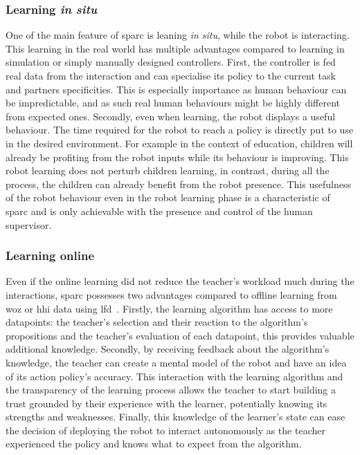 \subsubsection{Learning \emph{in situ}}
One of the main feature of \gls{sparc} is leaning \emph{in situ}, while the robot is interacting. This learning in the real world has multiple advantages compared to learning in simulation or simply manually designed controllers. First, the controller is fed real data from the interaction and can specialise its policy to the current task and partners specificities. This is especially importance as human behaviour can be impredictable, and as such real human behaviours might be highly different from expected ones. Secondly, even when learning, the robot displays a useful behaviour. The time required for the robot to reach a policy is directly put to use in the desired environment. For example in the context of education, children will already be profiting from the robot inputs while its behaviour is improving. This robot learning does not perturb children learning, in contrast, during all the process, the children can already benefit from the robot presence. This usefulness of the robot behaviour even in the robot learning phase is a characteristic of \gls{sparc} and is only achievable with the presence and control of the human supervisor.

\subsubsection{Learning online}
Even if the online learning did not reduce the teacher's workload much during the interactions, \gls{sparc} possesses two advantages compared to offline learning from \gls{woz} or \gls{hhi} data using \gls{lfd}~\citep{sequeira2016discovering,liu2014train}. Firstly, the learning algorithm has access to more datapoints: the teacher's selection and their reaction to the algorithm's propositions and the teacher's evaluation of each datapoint, this provides valuable additional knowledge. Secondly, by receiving feedback about the algorithm's knowledge, the teacher can create a mental model of the robot and have an idea of its action policy's accuracy. This interaction with the learning algorithm and the transparency of the learning process allows the teacher to start building a trust grounded by their experience with the learner, potentially knowing its strengths and weaknesses. Finally, this knowledge of the learner's state can ease the decision of deploying the robot to interact autonomously as the teacher experienced the policy and knows what to expect from the algorithm.


